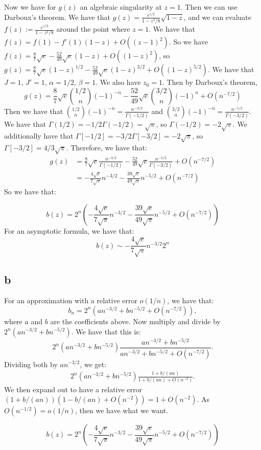 \documentclass[]{article}
\theoremstyle{definition}
\numberwithin{theorem}{section}
\numberwithin{equation}{section}
\begin{document}
Now we have for $g(z)$ an algebraic singularity at $z = 1$. Then we can use Darboux's theorem. We have that $g(z) = \frac{e^{z/2}}{1 - z^3/8} \sqrt{1 - z}$, and we can evaluate $f(z) := \frac{e^{z/2}}{1 - z^3/8} $ around the point where $z = 1$. 
We have that $f(z) = f(1) - f'(1) (1 - z) + O((z - 1)^2)$. So we have $f(z) = \frac{8}{7}\sqrt{e} -  \frac{52}{49}\sqrt{e}(1-z) + O((1 - z)^2)$, so $g(z) = \frac{8}{7}\sqrt{e}(1 - z)^{1/2} -  \frac{52}{49}\sqrt{e}(1-z)^{3/2} + O((1 - z)^{5/2})$. 
We have that $J = 1$, $J' = 1$, $\alpha = 1/2$, $\beta = 1$. We also have $z_0 = 1$.
Then by Darboux's theorem, 
\begin{equation}
	[z^n] g(z) = \frac{8}{7}\sqrt{e} \binom{1/2}{n} (-1)^{-n} -  \frac{52}{49}\sqrt{e} \binom{3/2}{n}(-1)^n + O(n^{-7/2})
\end{equation}
Then we have that $\binom{1/2}{n} (-1)^{-n} = \frac{n^{-3/2}}{\Gamma(-1/2)}$ and  $\binom{3/2}{n} (-1)^{-n} = \frac{n^{-5/2}}{\Gamma(-3/2)}$. 
We have that $\Gamma(1/2) = -1/2 \Gamma(-1/2) = \sqrt{\pi}$, so $\Gamma(-1/2) = - 2 \sqrt{\pi}$. We additionally have that $\Gamma[-1/2] = -3/2 \Gamma[-3/2] = -2 \sqrt{\pi}$, so $\Gamma[-3/2] = 4/3 \sqrt{\pi}$. Therefore, we have that:
\begin{align*}
	[z^n] g(z) &= \frac{8}{7}\sqrt{e} \frac{n^{-3/2}}{\Gamma(-1/2)} -  \frac{52}{49}\sqrt{e} \frac{n^{-5/2}}{\Gamma(-3/2)} + O(n^{-7/2})\\
	&= -\frac{4 \sqrt{e}}{7 \sqrt{\pi}} n^{-3/2} - \frac{39 \sqrt{e}}{49\sqrt{\pi}} n^{-5/2} + O(n^{-7/2})
\end{align*}
So we have that:

\begin{equation}
	[z^n] b(z) = 2^n \left( -\frac{4 \sqrt{e}}{7 \sqrt{\pi}} n^{-3/2} - \frac{39 \sqrt{e}}{49\sqrt{\pi}} n^{-5/2} + O(n^{-7/2})\right)
\end{equation}
For an asymptotic formula, we have that:
\begin{equation}
	[z^n] b(z) \sim -\frac{4 \sqrt{e}}{7 \sqrt{\pi}} n^{-3/2} 2^n
\end{equation}
\subsection{b}
For an approximation with a relative error $o(1/n)$, we have that:
\begin{equation}
	b_n = 2^n ( a n^{-3/2} + b n^{-5/2} + O(n^{-7/2})),
\end{equation}
where $a$ and $b$ are the coefficients above. 
Now multiply and divide by $2^n(a n^{-3/2} + b n^{-5/2})$. We have that this is:
\begin{equation}
	2^n(a n^{-3/2} + b n^{-5/2}) \frac{a n^{-3/2} + b n^{-5/2}}{a n^{-3/2} + b n^{-5/2} + O(n^{-7/2})}.
\end{equation}
Dividing both by $a n^{-3/2}$, we get:
\begin{align*}
	2^n(a n^{-3/2} + b n^{-5/2}) \frac{1 + b/(an)}{1 + b/(an) + O(n^{-2})}.
\end{align*}
We then expand out to have a relative error $(1 + b/(an)) (1 -b/(an) + O(n^{-2})) = 1 + O(n^{-2})$. As $O(n^{-1/2})  = o(1/n)$, then we have what we want. 

\begin{equation}
	[z^n] b(z) = 2^n \left( -\frac{4 \sqrt{e}}{7 \sqrt{\pi}} n^{-3/2} - \frac{39 \sqrt{e}}{49\sqrt{\pi}} n^{-5/2} + O(n^{-7/2})\right)
\end{equation}
\end{document}
